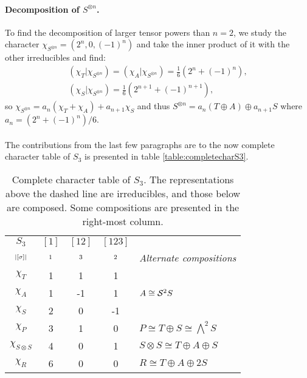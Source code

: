 \paragraph{Decomposition of $S^{\otimes n}$.}\cite[Exercise 2.7.]{FultonHarris} To find the decomposition of larger tensor powers than $n=2$, we study the character $\chi_{S^{\otimes n}} = (2^n, 0, (-1)^n)$ and take the inner product of it with the other irreducibles and find:
\begin{align}
	({\chi_T}|{\chi_{S^{\otimes n}}}) = ({\chi_A}|{\chi_{S^{\otimes n}}}) = \frac{1}{6}\left(2^n + (-1)^n\right), \\
	({\chi_S}|{\chi_{S^{\otimes n}}}) = \frac{1}{6}\left(2^{n+1} + (-1)^{n+1}\right), 
\end{align}
so $\chi_{S^{\otimes n}} = a_n (\chi_T + \chi_A) + a_{n+1} \chi_S$ and thus $S^{\otimes n} = a_n (T \oplus A) \oplus a_{n+1} S$ where $a_n = \left(2^n + (-1)^n\right)/6$.

\paragraph{} The contributions from the last few paragraphs are to the now complete character table of $S_3$ is presented in table \ref{table:completecharS3}.

\begin{table}[hbt!]
	\centering
	
	\begin{tabular}{c | c c c | l}
		$S_3$         & $[1]$   & $[12]$  & $[123]$ &                                          \\
		$\scriptstyle|[\sigma]|$    & $\scriptstyle 1$ & $\scriptstyle 3$ & $\scriptstyle 2$ &  \textit{Alternate compositions}         \\ \hline
		$\chi_T$       & 1       & 1       & 1       &                                          \\
		$\chi_A$       & 1       & -1      & 1       & $ A \cong \mathcal{S}^2S$                       \\
		$\chi_S$       & 2       & 0       & -1      &                                          \\ \hline\hline
		$\chi_P$       & 3       & 1       & 0       & $ P \cong T \oplus S \cong \bigwedge^2S$ \\
		$\chi_{S \otimes S}$ & 4       & 0       & 1       & $ S \otimes S \cong T \oplus A \oplus S$ \\
		$\chi_R$       & 6       & 0       & 0       & $ R \cong T \oplus A \oplus 2S$
	\end{tabular}
	\caption{Complete character table of $S_3$. The representations above the dashed line are irreducibles, and those below are composed. Some compositions are presented in the right-most column.}
\end{table}

